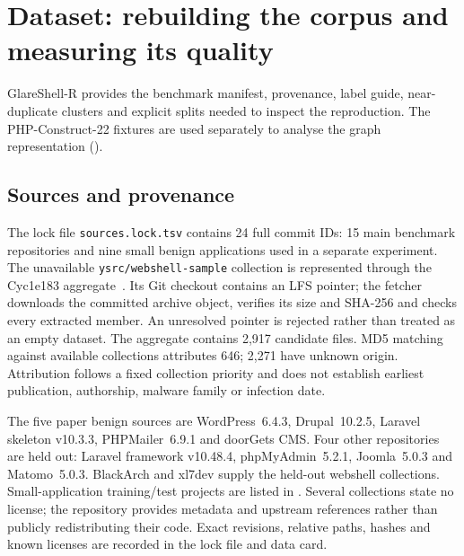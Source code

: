 \section{Dataset: rebuilding the corpus and measuring its quality}\label{sec:dataset}
GlareShell-R provides the benchmark manifest, provenance, label guide, near-duplicate clusters and explicit
splits needed to inspect the reproduction. The PHP-Construct-22 fixtures are used separately to analyse
the graph representation ().

\subsection{Sources and provenance}
The lock file \texttt{sources.lock.tsv} contains 24 full commit IDs: 15 main benchmark repositories and
nine small benign applications used in a separate experiment. The unavailable \texttt{ysrc/webshell-sample}
collection is represented through the Cyc1e183 aggregate~\cite{cyc1e183}. Its Git checkout contains an LFS
pointer; the fetcher downloads the committed archive object, verifies its size and SHA-256 and checks every
extracted member. An unresolved pointer is rejected rather than treated as an empty dataset.
The aggregate contains 2,917 candidate files. MD5 matching against available collections attributes 646;
2,271 have unknown origin. Attribution follows a fixed collection priority and does not establish earliest
publication, authorship, malware family or infection date.

The five paper benign sources are WordPress~6.4.3, Drupal~10.2.5, Laravel skeleton v10.3.3,
PHPMailer~6.9.1 and doorGets CMS. Four other repositories are held out: Laravel framework v10.48.4,
phpMyAdmin~5.2.1, Joomla~5.0.3 and Matomo~5.0.3. BlackArch and xl7dev supply the held-out webshell
collections. Small-application training/test projects are listed in .
Several collections state no license; the repository provides metadata and upstream references rather
than publicly redistributing their code. Exact revisions, relative paths, hashes and known licenses are
recorded in the lock file and data card.

\begin{table}[!t]\centering\footnotesize
\caption{V2 corpus funnel per source. Exact: first retained SHA-256 representative. Lexical: first token-whitespace
representative. Paper sources take priority over held-out sources when a file appears in both.}\label{tab:funnel}
\begin{fittable}\end{fittable}
\end{table}

